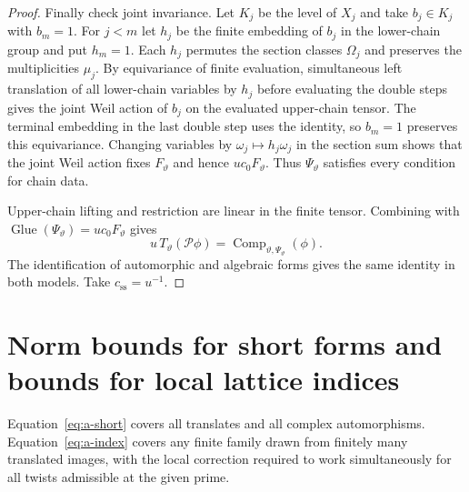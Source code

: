\begin{proof}
Finally check joint invariance. Let $K_j$ be the level of $X_j$ and take $b_j\in K_j$ with $b_m=1$. For $j<m$ let $h_j$ be the finite embedding of $b_j$ in the lower-chain group and put $h_m=1$. Each $h_j$ permutes the section classes $\Omega_j$ and preserves the multiplicities $\mu_j$. By equivariance of finite evaluation, simultaneous left translation of all lower-chain variables by $h_j$ before evaluating the double steps gives the joint Weil action of $b_j$ on the evaluated upper-chain tensor. The terminal embedding in the last double step uses the identity, so $b_m=1$ preserves this equivariance. Changing variables by $\omega_j\mapsto h_j\omega_j$ in the section sum shows that the joint Weil action fixes $F_\vartheta$ and hence $u c_0F_\vartheta$. Thus $\Psi_\vartheta$ satisfies every condition for chain data.

Upper-chain lifting and restriction are linear in the finite tensor. Combining  with $\operatorname{Glue}(\Psi_\vartheta)=u c_0F_\vartheta$ gives
\[
 u\,T_\vartheta(\mathcal P\phi)=\operatorname{Comp}_{\vartheta,\Psi_\vartheta}(\phi).
\]
The identification of automorphic and algebraic forms gives the same identity in both models. Take $c_{\mathrm{ss}}=u^{-1}$.
\end{proof}

\section{Norm bounds for short forms and bounds for local lattice indices}
\label{sec:a-conclusions}

Equation~\eqref{eq:a-short} covers all translates and all complex automorphisms. Equation~\eqref{eq:a-index} covers any finite family drawn from finitely many translated images, with the local correction required to work simultaneously for all twists admissible at the given prime.

